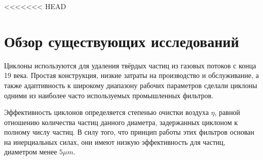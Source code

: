 <<<<<<< HEAD
\section{Обзор существующих исследований}
	Циклоны используются для удаления твёрдых частиц из газовых потоков с конца 19 века. Простая конструкция, низкие затраты на производство и обслуживание, а также адаптивность к широкому диапазону рабочих параметров сделали циклоны одними из наиболее часто используемых промышленных фильтров. 
	
		Эффективность циклонов определяется степенью очистки воздуха $\eta$, равной отношению количества частиц данного диаметра, задержанных циклоном к полному числу частиц. В силу того, что принцип работы этих фильтров основан на инерциальных силах, они имеют низкую эффективность для частиц, диаметром менее $5 \mu m$.
	
